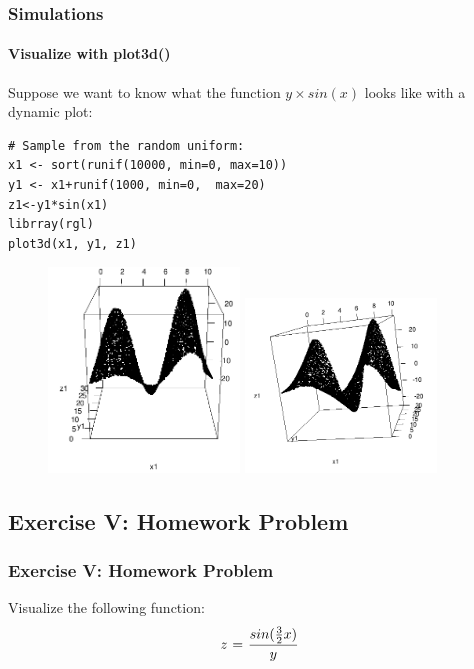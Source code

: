 \begin{frame}
\frametitle{Simulations}
\framesubtitle{Visualize with \ttfamily plot3d() \normalfont}

Suppose we want to know what the function $y\times sin(x)$ looks like with a dynamic plot:

\begin{lstlisting}
# Sample from the random uniform:
x1 <- sort(runif(10000, min=0, max=10))
y1 <- x1+runif(1000, min=0,  max=20)
z1<-y1*sin(x1)
librray(rgl)
plot3d(x1, y1, z1)

\end{lstlisting}

\newpage
   \begin{figure}[ht]
       \begin{center}
		\includegraphics[width = 2in]{images/plot3dSin1.png}
		\includegraphics[width = 2in]{images/plot3dSin2.png}
	\end{center}
   \end{figure}
\end{frame}


\subsection{Exercise V: Homework Problem}
\begin{frame}
	\frametitle{Exercise V: Homework Problem}
	Visualize the following function:
	\begin{equation}
		z \hspace{0.01in} =\hspace{0.01in} \frac{sin(\frac{3}{2}x)}{y}
	\end{equation}	
\end{frame}


